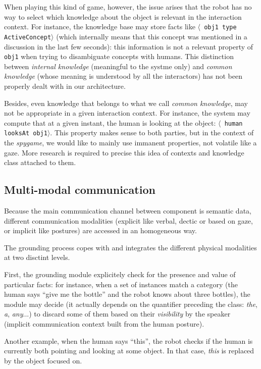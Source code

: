\documentclass[letterpaper, 10 pt, conference]{ieeeconf}  %
\newcommand{\concept}[1]{{\small \texttt{#1}}}
\newcommand{\stmt}[1]{{\footnotesize \tt $\langle$ #1\relax$\rangle$}}
\begin{document}
When playing this kind of game, however, the issue arises that the robot has no
way to select which knowledge about the object is relevant in the interaction
context. For instance, the knowledge base may store facts like \stmt{obj1 type
ActiveConcept} (which internally means that this concept was mentioned in a
discussion in the last few seconds): this information is not a relevant
property of \concept{obj1} when trying to disambiguate concepts with humans.
This distinction between \emph{internal knowledge} (meaningful to
the systme only) and \emph{common knowledge} (whose meaning is understood by
all the interactors) has not been properly dealt with in our architecture.

Besides, even knowledge that belongs to what we call \emph{common knowledge},
may not be appropriate in a given interaction context. For instance, the system
may compute that at a given instant, the human is looking at the object:
\stmt{human looksAt obj1}. This property makes sense to both parties, but in
the context of the \emph{spygame}, we would like to mainly use immanent
properties, not volatile like a gaze. More research is required to precise this
idea of contexts and knowledge class attached to them.



\subsection{Multi-modal communication}

Because the main communication channel between component is semantic data,
different communication modalities (explicit like verbal, dectic or based on
gaze, or implicit like postures) are accessed in an homogeneous way.

The grounding process copes with and integrates the different physical
modalities at two disctint levels.

First, the grounding module explicitely check for the presence and value of
particular facts: for instance, when a set of instances match a category (the
human says ``give me the bottle'' and the robot knows about three bottles), the
module may decide (it actually depends on the quantifier preceding the class:
\emph{the}, \emph{a}, \emph{any}...) to discard some of them based on their
\emph{visibility} by the speaker (implicit communication context built from the
human posture).

Another example, when the human says ``this'', the robot checks if the human is
currently both pointing and looking at some object. In that case, \emph{this}
is replaced by the object focused on.
\end{document}
